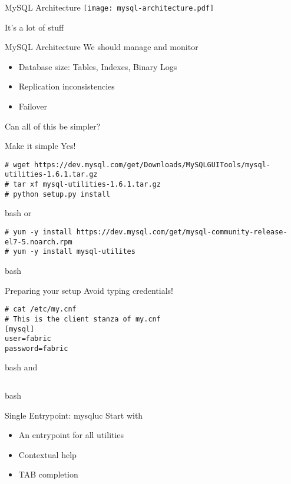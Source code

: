 \documentclass{beamer}[10]
\begin{document}
\begin{pyframe}{MySQL Architecture}
\texttt{[image: mysql-architecture.pdf]}
{\large
\begin{center}
It's a lot of stuff
\end{center}
}
\end{pyframe}


\begin{pyframe}{MySQL Architecture}
We should manage and monitor
\begin{itemize}
\item Database size: Tables, Indexes, Binary Logs
\item Replication inconsistencies
\item Failover
\end{itemize}
Can all of this be simpler?
\end{pyframe}


\begin{pyframe}{Make it simple}
Yes!
\begin{verbatim}
# wget https://dev.mysql.com/get/Downloads/MySQLGUITools/mysql-utilities-1.6.1.tar.gz
# tar xf mysql-utilities-1.6.1.tar.gz
# python setup.py install
\end{verbatim}{bash}
or
\begin{verbatim}
# yum -y install https://dev.mysql.com/get/mysql-community-release-el7-5.noarch.rpm
# yum -y install mysql-utilites
\end{verbatim}{bash}
\end{pyframe}


\begin{pyframe}{Preparing your setup}
Avoid typing credentials!
\begin{verbatim}
# cat /etc/my.cnf
# This is the client stanza of my.cnf
[mysql]
user=fabric
password=fabric
\end{verbatim}{bash}
and
\begin{verbatim}

\end{verbatim}{bash}
\end{pyframe}




\begin{pyframe}{Single Entrypoint: mysqluc}
Start with 

\begin{itemize}
\item An entrypoint for all utilities
\item Contextual help
\item TAB completion
\end{itemize}
\end{pyframe}
\end{document}
